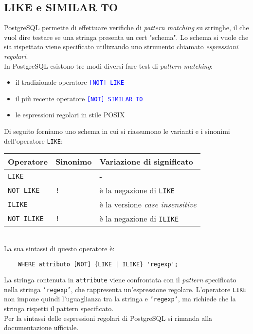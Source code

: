 \documentclass[12pt,a4paper]{book}
\begin{document}
	\subsection{LIKE e SIMILAR TO}
	PostgreSQL permette di effettuare verifiche di \textit{pattern matching} su stringhe, il che vuol dire testare se una stringa presenta un cert "schema". Lo schema si vuole che sia rispettato viene specificato utilizzando uno strumento chiamato \textit{espressioni regolari}.\\
	In PostgreSQL esistono tre modi diversi fare test di \textit{pattern matching}:
	\begin{itemize}
		\item il tradizionale operatore \textcolor{blue}{\texttt{[NOT] LIKE}}
		\item il più recente operatore \textcolor{blue}{\texttt{[NOT] SIMILAR TO}}
		\item le espressioni regolari in stile POSIX
	\end{itemize}
	Di seguito forniamo uno schema in cui si riassumono le varianti e i sinonimi dell'operatore \texttt{LIKE}:\vspace{10px}\\
	\begin{tabular}{l l l}
		Operatore & Sinonimo & Variazione di significato\\
		\hline
		\texttt{LIKE} & \texttt{\texttildelow\texttildelow} & -\\ 
		\texttt{NOT LIKE} & \texttt{!\texttildelow\texttildelow} & è la negazione di \texttt{LIKE}\\
		\texttt{ILIKE} & \texttt{\texttildelow\texttildelow*} & è la versione \textit{case insensitive}\\
		\texttt{NOT ILIKE} & \texttt{!\texttildelow\texttildelow*} & è la negazione di \texttt{ILIKE}
	\end{tabular}\vspace{10px}\\
	La sua sintassi di questo operatore è:
	\begin{lstlisting}
	WHERE attributo [NOT] {LIKE | ILIKE} 'regexp';
	\end{lstlisting}
	La stringa contenuta in \texttt{attribute} viene confrontata con il \textit{pattern} specificato nella stringa \texttt{'regexp'}, che rappresenta un'espressione regolare. L'operatore \texttt{LIKE} non impone quindi l'uguaglianza tra la stringa e \texttt{'regexp'}, ma richiede che la stringa rispetti il pattern specificato.\\
	Per la sintassi delle espressioni regolari di PostgreSQL si rimanda alla documentazione ufficiale.\\
\end{document}
